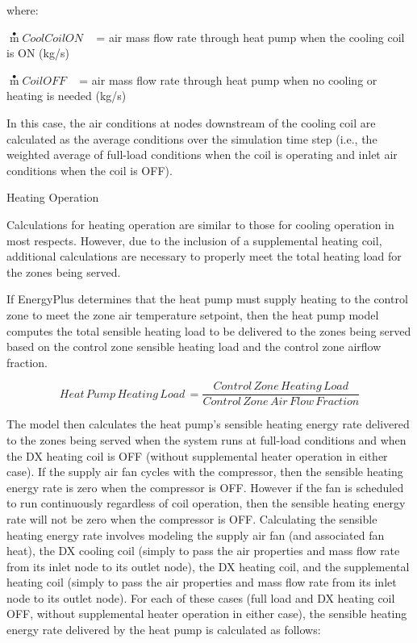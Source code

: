 where:

\(\mathop m\limits^ \bullet CoolCoilON\) ~ = air mass flow rate through heat pump when the cooling coil is ON (kg/s)

\(\mathop m\limits^ \bullet CoilOFF\) ~ = air mass flow rate through heat pump when no cooling or heating is needed (kg/s)

In this case, the air conditions at nodes downstream of the cooling coil are calculated as the average conditions over the simulation time step (i.e., the weighted average of full-load conditions when the coil is operating and inlet air conditions when the coil is OFF).

Heating Operation

Calculations for heating operation are similar to those for cooling operation in most respects. However, due to the inclusion of a supplemental heating coil, additional calculations are necessary to properly meet the total heating load for the zones being served.

If EnergyPlus determines that the heat pump must supply heating to the control zone to meet the zone air temperature setpoint, then the heat pump model computes the total sensible heating load to be delivered to the zones being served based on the control zone sensible heating load and the control zone airflow fraction.

\begin{equation}
Heat\,Pump\,Heating\,Load\, = \frac{{Control\,Zone\,Heating\,Load}}{{Control\,Zone\,Air\,Flow\,Fraction}}
\end{equation}

The model then calculates the heat pump's sensible heating energy rate delivered to the zones being served when the system runs at full-load conditions and when the DX heating coil is OFF (without supplemental heater operation in either case). If the supply air fan cycles with the compressor, then the sensible heating energy rate is zero when the compressor is OFF. However if the fan is scheduled to run continuously regardless of coil operation, then the sensible heating energy rate will not be zero when the compressor is OFF. Calculating the sensible heating energy rate involves modeling the supply air fan (and associated fan heat), the DX cooling coil (simply to pass the air properties and mass flow rate from its inlet node to its outlet node), the DX heating coil, and the supplemental heating coil (simply to pass the air properties and mass flow rate from its inlet node to its outlet node). For each of these cases (full load and DX heating coil OFF, without supplemental heater operation in either case), the sensible heating energy rate delivered by the heat pump is calculated as follows:

